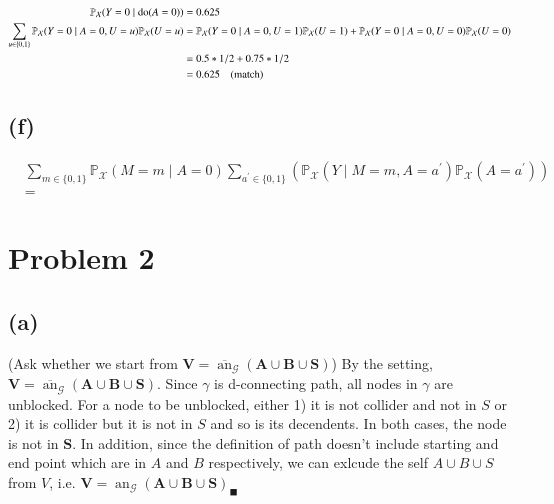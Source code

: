 \documentclass[10pt]{article}
\begin{document}
\begin{align*}
    \mathbb{P}_{\mathcal{X}}(Y=0 \mid \operatorname{do}(A=0))&=0.625\\
    \sum_{u \in\{0,1\}} \mathbb{P}_{\mathcal{X}}(Y=0 \mid A=0, U=u) \mathbb{P}_{\mathcal{X}}(U=u)&=\mathbb{P}_{\mathcal{X}}(Y=0 \mid A=0, U=1) \mathbb{P}_{\mathcal{X}}(U=1) + \mathbb{P}_{\mathcal{X}}(Y=0 \mid A=0, U=0) \mathbb{P}_{\mathcal{X}}(U=0)\\
    &= 0.5 * 1/2 + 0.75 * 1/2\\
    &= 0.625 \text{\quad (match)}
\end{align*}

\subsection{(f)}

\begin{align*}
    &\sum_{m \in\{0,1\}} \mathbb{P}_{\mathcal{X}}(M=m \mid A=0) \sum_{a^{\prime} \in\{0,1\}}\left(\mathbb{P}_{\mathcal{X}}\left(Y \mid M=m, A=a^{\prime}\right) \mathbb{P}_{\mathcal{X}}\left(A=a^{\prime}\right)\right)\\
    &=
\end{align*}

\section{Problem 2}

\subsection{(a)}
(Ask whether we start from $\mathbf{V}=\overline{\operatorname{an}}_{\mathcal{G}}(\mathbf{A} \cup \mathbf{B} \cup \mathbf{S})$)
By the setting, $\mathbf{V}=\overline{\operatorname{an}}_{\mathcal{G}}(\mathbf{A} \cup \mathbf{B} \cup \mathbf{S})$. 
Since $\gamma$ is d-connecting path, all nodes in $\gamma$ are unblocked. 
For a node to be unblocked, either 1) it is not collider and not in $S$ or 2) it is collider but it is not in $S$ and so is its decendents.
In both cases, the node is not in $\mathbf{S}$. In addition, since the definition of path doesn't include starting and end point which are in $A$ and $B$ respectively, we can exlcude the self $A\cup B\cup S$ from $V$, i.e.   $\mathbf{V}=\operatorname{an}_{\mathcal{G}}(\mathbf{A} \cup \mathbf{B} \cup \mathbf{S})_\blacksquare$ 
\end{document}
